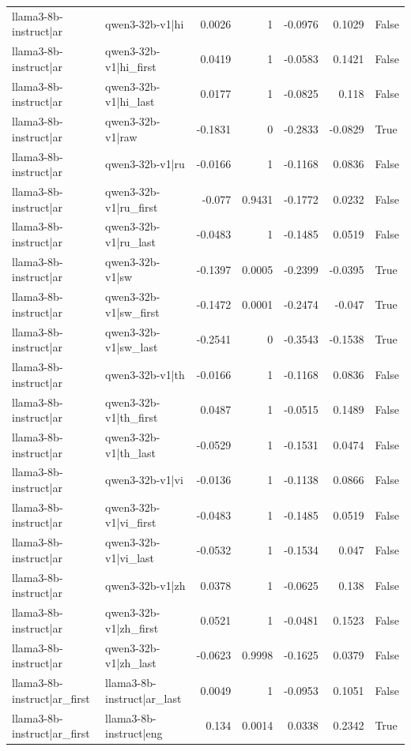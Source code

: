 \begin{table}
\begin{tabular}{l l r r r r l}
llama3-8b-instruct|ar & qwen3-32b-v1|hi & 0.0026 & 1 & -0.0976 & 0.1029 & False \\
llama3-8b-instruct|ar & qwen3-32b-v1|hi_first & 0.0419 & 1 & -0.0583 & 0.1421 & False \\
llama3-8b-instruct|ar & qwen3-32b-v1|hi_last & 0.0177 & 1 & -0.0825 & 0.118 & False \\
llama3-8b-instruct|ar & qwen3-32b-v1|raw & -0.1831 & 0 & -0.2833 & -0.0829 & True \\
llama3-8b-instruct|ar & qwen3-32b-v1|ru & -0.0166 & 1 & -0.1168 & 0.0836 & False \\
llama3-8b-instruct|ar & qwen3-32b-v1|ru_first & -0.077 & 0.9431 & -0.1772 & 0.0232 & False \\
llama3-8b-instruct|ar & qwen3-32b-v1|ru_last & -0.0483 & 1 & -0.1485 & 0.0519 & False \\
llama3-8b-instruct|ar & qwen3-32b-v1|sw & -0.1397 & 0.0005 & -0.2399 & -0.0395 & True \\
llama3-8b-instruct|ar & qwen3-32b-v1|sw_first & -0.1472 & 0.0001 & -0.2474 & -0.047 & True \\
llama3-8b-instruct|ar & qwen3-32b-v1|sw_last & -0.2541 & 0 & -0.3543 & -0.1538 & True \\
llama3-8b-instruct|ar & qwen3-32b-v1|th & -0.0166 & 1 & -0.1168 & 0.0836 & False \\
llama3-8b-instruct|ar & qwen3-32b-v1|th_first & 0.0487 & 1 & -0.0515 & 0.1489 & False \\
llama3-8b-instruct|ar & qwen3-32b-v1|th_last & -0.0529 & 1 & -0.1531 & 0.0474 & False \\
llama3-8b-instruct|ar & qwen3-32b-v1|vi & -0.0136 & 1 & -0.1138 & 0.0866 & False \\
llama3-8b-instruct|ar & qwen3-32b-v1|vi_first & -0.0483 & 1 & -0.1485 & 0.0519 & False \\
llama3-8b-instruct|ar & qwen3-32b-v1|vi_last & -0.0532 & 1 & -0.1534 & 0.047 & False \\
llama3-8b-instruct|ar & qwen3-32b-v1|zh & 0.0378 & 1 & -0.0625 & 0.138 & False \\
llama3-8b-instruct|ar & qwen3-32b-v1|zh_first & 0.0521 & 1 & -0.0481 & 0.1523 & False \\
llama3-8b-instruct|ar & qwen3-32b-v1|zh_last & -0.0623 & 0.9998 & -0.1625 & 0.0379 & False \\
llama3-8b-instruct|ar_first & llama3-8b-instruct|ar_last & 0.0049 & 1 & -0.0953 & 0.1051 & False \\
llama3-8b-instruct|ar_first & llama3-8b-instruct|eng & 0.134 & 0.0014 & 0.0338 & 0.2342 & True \\

\end{tabular}
\end{table}
